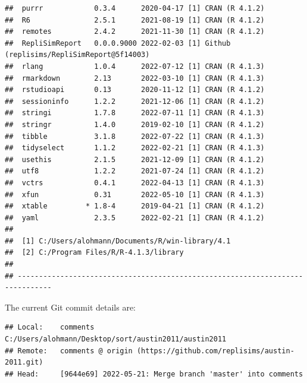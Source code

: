 \documentclass[10,a4paperpaper,]{article}
\begin{document}
\begin{verbatim}
##  purrr            0.3.4      2020-04-17 [1] CRAN (R 4.1.2)
##  R6               2.5.1      2021-08-19 [1] CRAN (R 4.1.2)
##  remotes          2.4.2      2021-11-30 [1] CRAN (R 4.1.2)
##  RepliSimReport   0.0.0.9000 2022-02-03 [1] Github (replisims/RepliSimReport@5f14003)
##  rlang            1.0.4      2022-07-12 [1] CRAN (R 4.1.3)
##  rmarkdown        2.13       2022-03-10 [1] CRAN (R 4.1.3)
##  rstudioapi       0.13       2020-11-12 [1] CRAN (R 4.1.2)
##  sessioninfo      1.2.2      2021-12-06 [1] CRAN (R 4.1.2)
##  stringi          1.7.8      2022-07-11 [1] CRAN (R 4.1.3)
##  stringr          1.4.0      2019-02-10 [1] CRAN (R 4.1.2)
##  tibble           3.1.8      2022-07-22 [1] CRAN (R 4.1.3)
##  tidyselect       1.1.2      2022-02-21 [1] CRAN (R 4.1.3)
##  usethis          2.1.5      2021-12-09 [1] CRAN (R 4.1.2)
##  utf8             1.2.2      2021-07-24 [1] CRAN (R 4.1.2)
##  vctrs            0.4.1      2022-04-13 [1] CRAN (R 4.1.3)
##  xfun             0.31       2022-05-10 [1] CRAN (R 4.1.3)
##  xtable         * 1.8-4      2019-04-21 [1] CRAN (R 4.1.2)
##  yaml             2.3.5      2022-02-21 [1] CRAN (R 4.1.2)
## 
##  [1] C:/Users/alohmann/Documents/R/win-library/4.1
##  [2] C:/Program Files/R/R-4.1.3/library
## 
## ------------------------------------------------------------------------------
\end{verbatim}

The current Git commit details are:

\begin{verbatim}
## Local:    comments C:/Users/alohmann/Desktop/sort/austin2011/austin2011
## Remote:   comments @ origin (https://github.com/replisims/austin-2011.git)
## Head:     [9644e69] 2022-05-21: Merge branch 'master' into comments
\end{verbatim}
\end{document}
